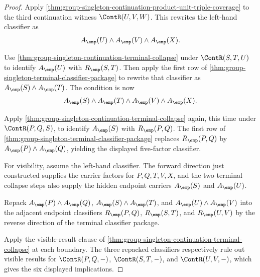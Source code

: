 \begin{proof}
Apply \autoref{thm:group-singleton-continuation-product-unit-triple-coverage}
to the third continuation witness $\ContR(U,V,W)$. This rewrites the left-hand
classifier as
$$
A_{\emp}(U)\land A_{\emp}(V)\land A_{\emp}(X).
$$

Use \autoref{thm:group-singleton-continuation-terminal-collapse} under
$\ContR(S,T,U)$ to identify $A_{\emp}(U)$ with $R_{\emp}(S,T)$. Then apply the
first row of \autoref{thm:group-singleton-terminal-classifier-package} to
rewrite that classifier as $A_{\emp}(S)\land A_{\emp}(T)$. The condition is
now
$$
A_{\emp}(S)\land A_{\emp}(T)\land A_{\emp}(V)\land A_{\emp}(X).
$$

Apply \autoref{thm:group-singleton-continuation-terminal-collapse} again, this
time under $\ContR(P,Q,S)$, to identify $A_{\emp}(S)$ with $R_{\emp}(P,Q)$.
The first row of \autoref{thm:group-singleton-terminal-classifier-package}
replaces $R_{\emp}(P,Q)$ by $A_{\emp}(P)\land A_{\emp}(Q)$, yielding the
displayed five-factor classifier.

For visibility, assume the left-hand classifier. The forward direction just
constructed supplies the carrier factors for $P,Q,T,V,X$, and the two terminal
collapse steps also supply the hidden endpoint carriers $A_{\emp}(S)$ and
$A_{\emp}(U)$.

Repack $A_{\emp}(P)\land A_{\emp}(Q)$, $A_{\emp}(S)\land A_{\emp}(T)$, and
$A_{\emp}(U)\land A_{\emp}(V)$ into the adjacent endpoint classifiers
$R_{\emp}(P,Q)$, $R_{\emp}(S,T)$, and $R_{\emp}(U,V)$ by the reverse direction
of the terminal classifier package.

Apply the visible-result clause of
\autoref{thm:group-singleton-continuation-terminal-collapse} at each boundary.
The three repacked classifiers respectively rule out visible results for
$\ContR(P,Q,-)$, $\ContR(S,T,-)$, and $\ContR(U,V,-)$, which gives the six
displayed implications.
\end{proof}
